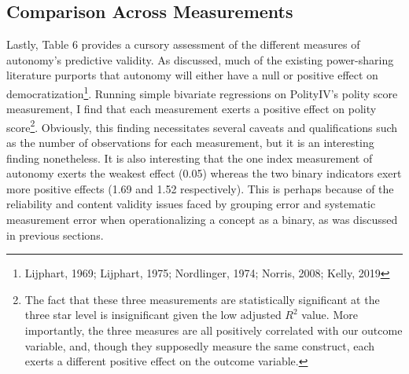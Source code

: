 \documentclass[12pt]{article}
\begin{document}
\subsection{Comparison Across Measurements}

Lastly, Table 6 provides a cursory assessment of the different measures of autonomy's predictive validity. As discussed, much of the existing power-sharing literature purports that autonomy will either have a null or positive effect on democratization\footnote{Lijphart, 1969; Lijphart, 1975; Nordlinger, 1974; Norris, 2008; Kelly, 2019}. Running simple bivariate regressions on PolityIV's polity score measurement, I find that each measurement exerts a positive effect on polity score\footnote{The fact that these three measurements are statistically significant at the three star level is insignificant given the low adjusted $R^2$ value. More importantly, the three measures are all positively correlated with our outcome variable, and, though they supposedly measure the same construct, each exerts a different positive effect on the outcome variable.}. Obviously, this finding necessitates several caveats and qualifications such as the number of observations for each measurement, but it is an interesting finding nonetheless. It is also interesting that the one index measurement of autonomy exerts the weakest effect (0.05) whereas the two binary indicators exert more positive effects (1.69 and 1.52 respectively). This is perhaps because of the reliability and content validity issues faced by grouping error and systematic measurement error when operationalizing a concept as a binary, as was discussed in previous sections.  
\end{document}
